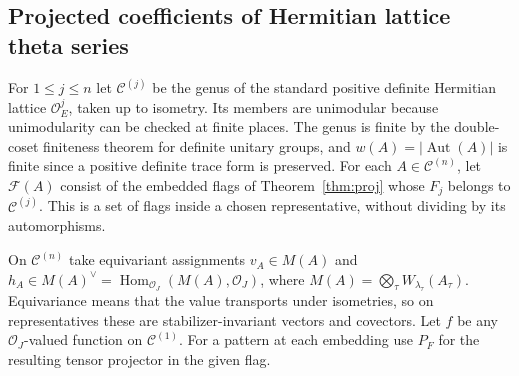 \documentclass[a4paper,11pt]{article}
\theoremstyle{definition}
\theoremstyle{remark}
\numberwithin{equation}{section}
\newcommand{\Aut}{\operatorname{Aut}}
\newcommand{\OO}{\mathcal O}
\begin{document}
\subsection{Projected coefficients of Hermitian lattice theta series}\label{nav:I-38}
For \(1\le j\le n\) let \(\mathcal C^{(j)}\) be the genus of the standard positive definite Hermitian lattice \(\OO_E^j\), taken up to isometry. Its members are unimodular because unimodularity can be checked at finite places. The genus is finite by the double-coset finiteness theorem for definite unitary groups, and \(w(A)=|\Aut(A)|\) is finite since a positive definite trace form is preserved. For each \(A\in\mathcal C^{(n)}\), let \(\mathcal F(A)\) consist of the embedded flags of Theorem~\ref{thm:proj} whose \(F_j\) belongs to \(\mathcal C^{(j)}\). This is a set of flags inside a chosen representative, without dividing by its automorphisms.~\cite{XIV-XI-IV-gross}

On \(\mathcal C^{(n)}\) take equivariant assignments \(v_A\in M(A)\) and \(h_A\in M(A)^\vee=\operatorname{Hom}_{\OO_J}(M(A),\OO_J)\), where \(M(A)=\bigotimes_\tau W_{\lambda_\tau}(A_\tau)\). Equivariance means that the value transports under isometries, so on representatives these are stabilizer-invariant vectors and covectors. Let \(f\) be any \(\OO_J\)-valued function on \(\mathcal C^{(1)}\). For a pattern at each embedding use \(P_F\) for the resulting tensor projector in the given flag.
\end{document}
